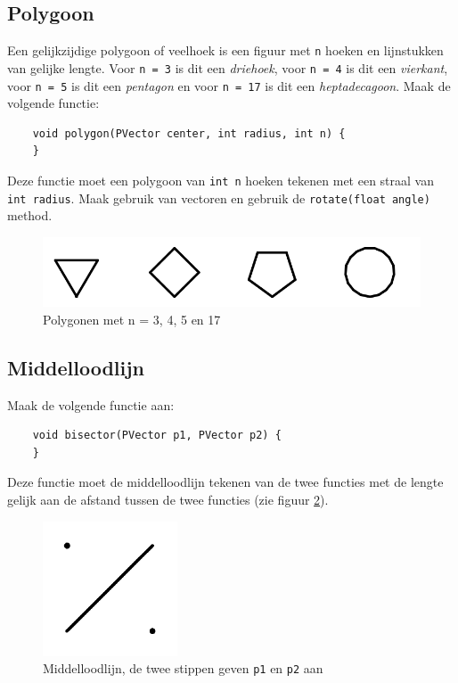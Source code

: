 \documentclass{../qh_exercise}
\begin{document}
\subsection{Polygoon}
Een gelijkzijdige polygoon of veelhoek is een figuur met \texttt{n} hoeken en lijnstukken van gelijke lengte. Voor \texttt{n = 3} is dit een \textit{driehoek}, voor \texttt{n = 4} is dit een \textit{vierkant}, voor \texttt{n = 5} is dit een \textit{pentagon} en voor \texttt{n = 17} is dit een \textit{heptadecagoon}. Maak de volgende functie:
\begin{lstlisting}
	void polygon(PVector center, int radius, int n) {
	}
\end{lstlisting}
Deze functie moet een polygoon van \texttt{int n} hoeken tekenen met een straal van \texttt{int radius}. Maak gebruik van vectoren en gebruik de \texttt{rotate(float angle)} method. \\
\begin{figure}[h!]
	\centering
	\includegraphics[width=\textwidth]{polygon.png}
	\caption{Polygonen met n = 3, 4, 5 en 17}
	\label{fig:polygon}
\end{figure}


\subsection{Middelloodlijn}
Maak de volgende functie aan:
\begin{lstlisting}
	void bisector(PVector p1, PVector p2) {
	}
\end{lstlisting}
Deze functie moet de middelloodlijn tekenen van de twee functies met de lengte gelijk aan de afstand tussen de twee functies (zie figuur \ref{fig:bisector}). 
\begin{figure}[H]
	\centering
	\includegraphics[width=4cm]{bisector.png}
	\caption{Middelloodlijn, de twee stippen geven \texttt{p1} en \texttt{p2} aan}
	\label{fig:bisector}
\end{figure}
\end{document}
